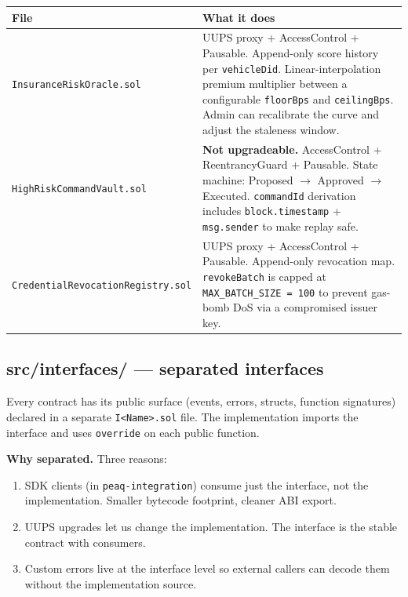 \documentclass[11pt,a4paper]{article}
\begin{document}
\begin{center}
\begin{tabular}{p{4.5cm} p{11cm}}
\toprule
{\bfseries\color{axiprimary}File} & {\bfseries\color{axiprimary}What it does} \\
\midrule
\texttt{InsuranceRiskOracle.sol} & UUPS proxy + AccessControl + Pausable. Append-only score history per \texttt{vehicleDid}. Linear-interpolation premium multiplier between a configurable \texttt{floorBps} and \texttt{ceilingBps}. Admin can recalibrate the curve and adjust the staleness window. \\
\addlinespace[2pt]
\texttt{HighRiskCommandVault.sol} & \textbf{Not upgradeable.} AccessControl + ReentrancyGuard + Pausable. State machine: Proposed $\rightarrow$ Approved $\rightarrow$ Executed. \texttt{commandId} derivation includes \texttt{block.timestamp} + \texttt{msg.sender} to make replay safe. \\
\addlinespace[2pt]
\texttt{CredentialRevocationRegistry.sol} & UUPS proxy + AccessControl + Pausable. Append-only revocation map. \texttt{revokeBatch} is capped at \texttt{MAX\_BATCH\_SIZE = 100} to prevent gas-bomb DoS via a compromised issuer key. \\
\bottomrule
\end{tabular}
\end{center}

\subsection{src/interfaces/ --- separated interfaces}

Every contract has its public surface (events, errors, structs, function signatures) declared in a separate \texttt{I<Name>.sol} file. The implementation imports the interface and uses \texttt{override} on each public function.

\textbf{Why separated.} Three reasons:

\begin{enumerate}[leftmargin=*, nosep]
  \item SDK clients (in \texttt{peaq-integration}) consume just the interface, not the implementation. Smaller bytecode footprint, cleaner ABI export.
  \item UUPS upgrades let us change the implementation. The interface is the stable contract with consumers.
  \item Custom errors live at the interface level so external callers can decode them without the implementation source.
\end{enumerate}
\end{document}
